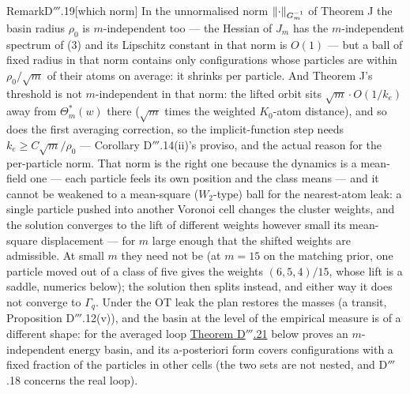 \begin{rmk}{Remark}{D$'''$.19}[which norm]
In the unnormalised norm $\lVert \cdot\rVert_{G_m^{-1}}$ of Theorem J the basin radius $\rho_0$ is $m$-independent too ---
the Hessian of $J_m$ has the $m$-independent spectrum of (3) and its Lipschitz constant in that norm is $O(1)$ --- but
a ball of fixed radius in that norm contains only configurations whose particles are within $\rho_0/\sqrt m$ of their
atoms on average: it shrinks per particle. And Theorem J's threshold is not $m$-independent in that norm: the lifted
orbit sits $\sqrt m\cdot O(1/k_e)$ away from $\Theta^*_m(w)$ there ($\sqrt m$ times the weighted $K_0$-atom
distance), and so does the first averaging correction, so the implicit-function step needs $k_e\ge C\sqrt m/\rho_0$
--- Corollary D$'''$.14(ii)'s proviso, and the actual reason for the per-particle norm. That norm is the right one
because the dynamics is a mean-field one --- each particle feels its own position and the class means --- and it
cannot be weakened to a mean-square ($W_2$-type) ball for the nearest-atom leak: a single particle pushed into
another Voronoi cell changes the cluster weights, and the solution converges to the lift of different weights however
small its mean-square displacement --- for $m$ large enough that the shifted weights are admissible. At small $m$
they need not be (at $m = 15$ on the matching prior, one particle moved out of a class of five gives the weights
$(6,5,4)/15$, whose lift is a saddle, numerics below); the solution then splits instead, and either way it does not
converge to $\Gamma_q$. Under the OT leak the plan restores the masses (a transit, Proposition D$'''$.12(v)), and the
basin at the level of the empirical measure is of a different shape: for the averaged loop
\hyperref[res:thmDppp:21]{Theorem D$'''$.21} below proves an $m$-independent energy basin, and its a-posteriori form
covers configurations with a fixed fraction of the particles in other cells (the two sets are not nested, and
D$'''$.18 concerns the real loop).
\end{rmk}

